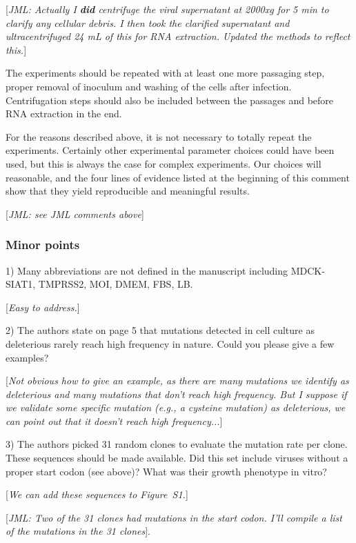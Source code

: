 \documentclass[11pt, oneside]{article}   	%
\newcommand{\comment}[1]{{\color{red}[\textsl{#1}]}}
\newcommand{\response}[1]{{\color{black}#1}}
\begin{document}
\comment{JML: Actually I {\bf did} centrifuge the viral supernatant at 2000xg for 5 min to clarify any cellular debris. I then took the clarified supernatant and ultracentrifuged 24 mL of this for RNA extraction. Updated the methods to reflect this.}

The experiments should be repeated with at least one more passaging step, proper removal of inoculum and washing of the cells after infection. Centrifugation steps should also be included between the passages and before RNA extraction in the end. 

\response{For the reasons described above, it is not necessary to totally repeat the experiments.
Certainly other experimental parameter choices could have been used, but this is always the case for complex experiments.
Our choices will reasonable, and the four lines of evidence listed at the beginning of this comment show that they yield reproducible and meaningful results.}

\comment{JML: see JML comments above}

\subsubsection*{Minor points} 

1) Many abbreviations are not defined in the manuscript including MDCK-SIAT1, TMPRSS2, MOI, DMEM, FBS, LB. 

\comment{Easy to address.}

2) The authors state on page 5 that mutations detected in cell culture as deleterious rarely reach high frequency in nature. Could you please give a few examples? 

\comment{Not obvious how to give an example, as there are many mutations we identify as deleterious and many mutations that don't reach high frequency. 
But I suppose if we validate some specific mutation (e.g., a cysteine mutation) as deleterious, we can point out that it doesn't reach high frequency...}

3) The authors picked 31 random clones to evaluate the mutation rate per clone. These sequences should be made available. Did this set include viruses without a proper start codon (see above)? What was their growth phenotype in vitro? 

\comment{We can add these sequences to Figure~S1.}

\comment{JML: Two of the 31 clones had mutations in the start codon. I'll compile a list of the mutations in the 31 clones}.
\end{document}
